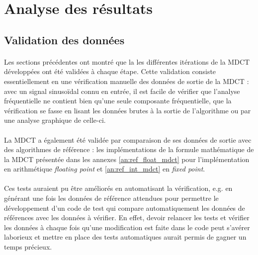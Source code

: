 \documentclass{article}
\begin{document}
    \newpage
    \section{Analyse des résultats}
    \subsection{Validation des données}
    \paragraph{}
    Les sections précédentes ont montré que la les différentes itérations de la MDCT développées ont été validées à chaque étape. Cette validation consiste essentiellement en une vérification manuelle des données de sortie de la MDCT : avec un signal sinusoïdal connu en entrée, il est facile de vérifier que l'analyse fréquentielle ne contient bien qu'une seule composante fréquentielle, que la vérification se fasse en lisant les données brutes à la sortie de l'algorithme ou par une analyse graphique de celle-ci.

    \paragraph{}
    La MDCT a également été validée par comparaison de ses données de sortie avec des algorithmes de référence : les implémentations de la formule mathématique de la MDCT présentée dans les annexes \ref{an:ref_float_mdct} pour l'implémentation en arithmétique \emph{floating point} et \ref{an:ref_int_mdct} en \emph{fixed point}.

    \paragraph{}
    Ces tests auraient pu être améliorés en automatisant la vérification, e.g. en générant une fois les données de référence attendues pour permettre le développement d'un code de test qui compare automatiquement les données de références avec les données à vérifier. En effet, devoir relancer les tests et vérifier les données à chaque fois qu'une modification est faite dans le code peut s'avérer laborieux et mettre en place des tests automatiques aurait permis de gagner un temps précieux.


\end{document}
